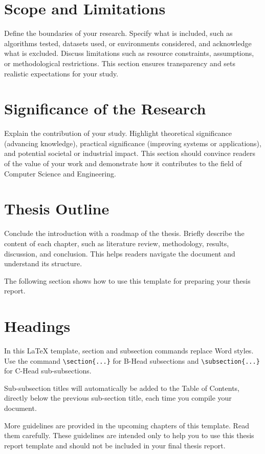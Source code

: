 \section{Scope and Limitations}
\label{sec:scope-limitations}

Define the boundaries of your research. Specify what is included, such as algorithms tested, datasets used, or environments considered, and acknowledge what is excluded. Discuss limitations such as resource constraints, assumptions, or methodological restrictions. This section ensures transparency and sets realistic expectations for your study.

\section{Significance of the Research}
\label{sec:significance}

Explain the contribution of your study. Highlight theoretical significance (advancing knowledge), practical significance (improving systems or applications), and potential societal or industrial impact. This section should convince readers of the value of your work and demonstrate how it contributes to the field of Computer Science and Engineering.

\section{Thesis Outline}
\label{sec:thesis-outline}

Conclude the introduction with a roadmap of the thesis. Briefly describe the content of each chapter, such as literature review, methodology, results, discussion, and conclusion. This helps readers navigate the document and understand its structure.

The following section shows how to use this template for preparing your thesis report.

\section{Headings}
\label{sec:headings}

In this \LaTeX{} template, section and subsection commands replace Word styles. Use the command \texttt{\textbackslash section\{...\}} for B-Head subsections and \texttt{\textbackslash subsection\{...\}} for C-Head sub-subsections.

Sub-subsection titles will automatically be added to the Table of Contents, directly below the previous sub-section title, each time you compile your document.

More guidelines are provided in the upcoming chapters of this template. Read them carefully. These guidelines are intended only to help you to use this thesis report template and should not be included in your final thesis report.
